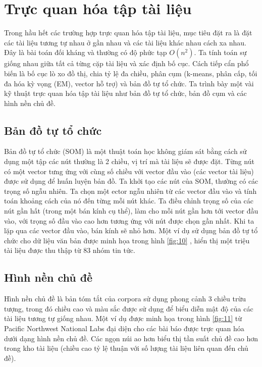 \documentclass[14pt, a4paper]{article}
\numberwithin{equation}{section}
\numberwithin{figure}{section}
\numberwithin{dl}{section}
\numberwithin{md}{section}
\numberwithin{bd}{section}
\numberwithin{dn}{section}
\numberwithin{hq}{section}
\begin{document}
    \section{Trực quan hóa tập tài liệu}

    Trong hầu hết các trường hợp trực quan hóa tập tài liệu, mục tiêu đặt ra là đặt các tài liệu tương tự nhau ở gần nhau và các tài liệu khác nhau cách xa nhau.
    Đây là bài toán đối kháng và thường có độ phức tạp $O(n^2)$.
    Ta tính toán sự giống nhau giữa tất cả từng cặp tài liệu và xác định bố cục.
    Cách tiếp cẩn phổ biến là bố cục lò xo đồ thị, chia tỷ lệ đa chiều, phân cụm (k-means, phân cấp, tối đa hóa kỳ vọng (EM), vector hỗ trợ) và bản đồ tự tổ chức.
    Ta trình bày một vài kỹ thuật trực quan hóa tập tài liệu như bản đồ tự tổ chức, bản đồ cụm và các hình nền chủ đề.

    \subsection{Bản đồ tự tổ chức}

    Bản đồ tự tổ chức (SOM) \cite{248} là một thuật toán học không giám sát bằng cách sử dụng một tập các nút thường là 2 chiều, vị trí mà tài liệu sẽ được đặt.
    Từng nút có một vector tưng ứng với cùng số chiều với vector đầu vào (các vector tài liệu) được sử dụng để huấn luyện bản đồ.
    Ta khởi tạo các nút của SOM, thường có các trọng số ngẫu nhiên.
    Ta chọn một ector ngẫu nhiên từ các vector đầu vào và tính toán khoảng cách của nó đến từng mỗi nút khác.
    Ta điều chỉnh trọng số của các nút gần hất (trong một bán kính cụ thể), làm cho mỗi nút gần hơn tới vector đầu vào,
    với trọng số đầu vào cao hơn tương ứng với nút được chọn gần nhất.
    Khi ta lặp qua các vector đầu vào, bán kính sẽ nhỏ hơn.
    Một ví dụ sử dụng bản đồ tự tổ chức cho dữ liệu văn bản được minh họa trong hình \ref{fig:10} \cite{454},
    hiển thị một triệu tài liệu được thu thập từ 83 nhóm tin tức.
    

    \subsection{Hình nền chủ đề}

    Hình nền chủ đề là bản tóm tắt của corpora sử dụng phong cảnh 3 chiều trừu tượng, trong đó chiều cao và màu sắc được sử dụng để biểu diễn mật độ của các tài liệu tương tự giống nhau.
    Một ví dụ được minh họa trong hình \ref{fig:11} từ Pacific Northwest National Labs \cite{407} đại diện cho các bài báo được trực quan hóa dưới dạng hình nền chủ đề.
    Các ngọn núi ao hơn biểu thị tần suất chủ đề cao hơn trong kho tài liệu (chiều cao tỷ lệ thuận với số lượng tài liệu liên quan đến chủ đề).
\end{document}
